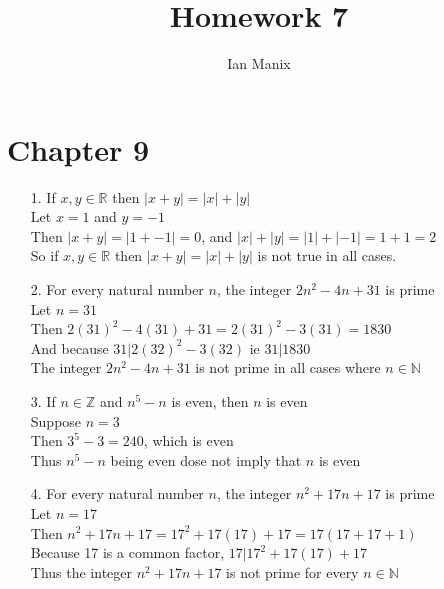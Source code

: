\documentclass[sigconf]{article}
\title{
  \textbf{Homework 7} \\
  }
\author{ 
  Ian Manix
  }
\begin{document}



\maketitle




\section*{Chapter 9}
\begin{itemize}
  \item[1.] If $x,y\in\mathbb{R}$ then $|x+y|=|x|+|y|$\\ %
            Let $x=1$ and $y=-1$\\
            Then $|x+y|=|1+-1|=0$, and $|x|+|y|=|1|+|-1|=1+1=2$\\
            So if $x,y\in\mathbb{R}$ then $|x+y|=|x|+|y|$ is not true in all cases.

  \item[2.] For every natural number $n$, the integer $2n^2-4n+31$ is prime\\ %
            Let $n=31$\\
            Then $2(31)^2-4(31)+31=2(31)^2-3(31)=1830$\\
            And because $31|2(32)^2-3(32)$ ie $31|1830$\\
            The integer $2n^2-4n+31$ is not prime in all cases where $n\in\mathbb{N}$\\

  \item[3.] If $n\in\mathbb{Z}$ and $n^5-n$ is even, then $n$ is even\\ %
            Suppose $n=3$\\
            Then $3^5-3=240$, which is even\\
            Thus $n^5-n$ being even dose not imply that $n$ is even

  \item[4.] For every natural number $n$, the integer $n^2+17n+17$ is prime\\ %
            Let $n=17$\\
            Then $n^2+17n+17=17^2+17(17)+17=17(17+17+1)$\\
            Because 17 is a common factor, $17|17^2+17(17)+17$\\
            Thus the integer $n^2+17n+17$ is not prime for every $n\in\mathbb{N}$


\end{itemize}
\end{document}
